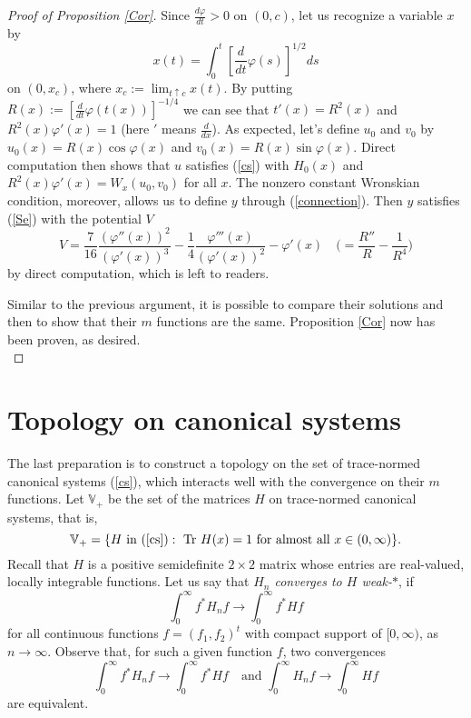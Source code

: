 \documentclass[preprint,12pt]{elsarticle}
\newcommand{\V}{{\mathbb V}}
\begin{document}
\begin{proof}[Proof of Proposition \ref{Cor}]
Since $\frac{d\varphi}{dt}>0$ on $(0,c)$, let us recognize a variable $x$  by 
\begin{equation*}
x(t)=\int_0^t \left[ \frac{d}{dt}\varphi(s) \right]^{1/2} ds   
\end{equation*}
on $(0,x_c)$, where $x_c:=\lim_{t\uparrow c} x(t)$. 
By putting $R(x):= \left[ \frac{d}{dt} \varphi(t(x)) \right] ^{-1/4}$ we can see that $t'(x)=R^2(x)$ and $R^2(x)\varphi'(x)=1$ (here $'$ means $\frac{d}{dx}$). As expected, let's define $u_0$ and $v_0$ by $u_0(x)=R(x) \cos\varphi(x)$ and $v_{0}(x)= R(x)\sin \varphi(x)$. Direct computation then shows that $u$ satisfies (\ref{cs}) with $H_0(x)$ and $R^2(x)\varphi'(x)=W_x(u_0,v_0)$ for all $x$. The nonzero constant Wronskian condition, moreover, allows us to define $y$ through  (\ref{connection}). Then $y$ satisfies (\ref{Se}) with the potential $V$ 
\begin{equation}
\label{formulaforV}
V=\frac7{16}\frac{(\varphi''(x))^2}{(\varphi'(x))^3}-\frac14\frac{\varphi'''(x)}{(\varphi'(x))^2}-\varphi'(x)\quad
\Big(=\frac{R''}{R}-\frac1{R^4} \Big)
\end{equation}
by direct computation, which is left to readers.
 
Similar to the previous argument, it is possible to compare their solutions and then to show that their $m$ functions are the same. Proposition \ref{Cor} now has been proven, as desired.\\ 
\end{proof}

\section{Topology on canonical systems}\label{sectop}
The last preparation is to construct a topology on the set of trace-normed canonical systems (\ref{cs}), which interacts well with the convergence on their $m$ functions.
Let $\V_+$ be the set of the matrices $H$ on trace-normed canonical systems, that is, 
\begin{equation*}
\V_+=\{ H \textrm{ in } (\ref{cs}): \textrm{ Tr }H(x)= 1 \textrm{ for almost all } x\in (0,\infty) \}.
\end{equation*}
Recall that $H$ is a positive semidefinite $2\times2$ matrix whose entries are real-valued, locally integrable functions. Let us say that \textit{$H_n$ converges to $H$ weak-$*$},  if   
\begin{equation}
\label{weak*conv}
\int_0^{\infty}f^*H_nf\to\int_0^{\infty}f^*Hf
\end{equation}
for all continuous functions $f=(f_1,f_2)^t$ with compact support of $[0,\infty)$, as $n\to\infty$. Observe that, for such a given function $f$, two convergences 
\begin{equation*}
\int_0^{\infty}f^*H_nf\to\int_0^{\infty}f^*Hf \quad \textrm{and }  \int_0^{\infty}H_nf\to\int_0^{\infty}Hf
\end{equation*}
are equivalent.\\
\end{document}
